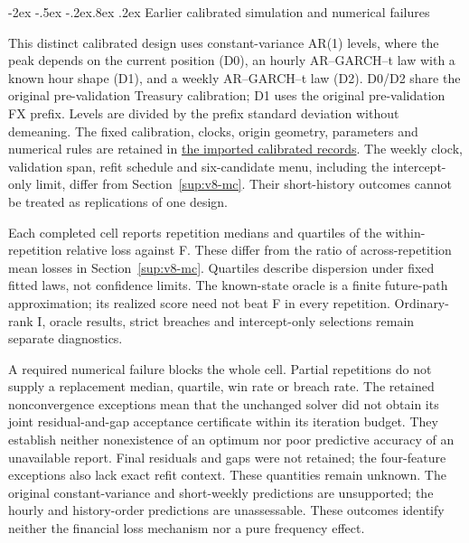 \documentclass[10pt,a4paper]{article}
\makeatletter
\renewcommand\section{\@startsection{section}{1}{\z@}%
  {-2ex \@plus -.5ex \@minus -.2ex}{.8ex \@plus .2ex}%
  {\normalfont\large\bfseries}}
\makeatother
\begin{document}
\section{Earlier calibrated simulation and numerical failures}\label{sup:v9-legacy-mc}

This distinct calibrated design uses constant-variance AR(1) levels, where the
peak depends on the current position (D0), an hourly AR--GARCH--t law with a
known hour shape (D1), and a weekly AR--GARCH--t law (D2).
D0/D2 share the original pre-validation Treasury calibration; D1 uses the
original pre-validation FX prefix. Levels are divided by the prefix standard
deviation without demeaning. The fixed calibration, clocks, origin geometry,
parameters and numerical rules are retained in
\href{https://github.com/ByronLi0207/financial-mathematics-paper-20261020/tree/revision-v10/results/v9/legacy-calibrated}{the imported calibrated records}.
The weekly clock, validation span, refit schedule and six-candidate menu,
including the intercept-only limit, differ from Section~\ref{sup:v8-mc}.
Their short-history outcomes cannot be treated as replications of one design.

Each completed cell reports repetition medians and quartiles of the
within-repetition relative loss against F. These differ from the ratio of
across-repetition mean losses in Section~\ref{sup:v8-mc}.
Quartiles describe dispersion under fixed fitted laws, not confidence limits.
The known-state oracle is a finite future-path approximation; its realized
score need not beat F in every repetition. Ordinary-rank I, oracle results,
strict breaches and intercept-only selections remain separate diagnostics.



A required numerical failure blocks the whole cell. Partial repetitions do
not supply a replacement median, quartile, win rate or breach rate.
The retained nonconvergence exceptions mean that the unchanged solver did not
obtain its joint residual-and-gap acceptance certificate within its iteration
budget. They establish neither nonexistence of an optimum nor poor predictive
accuracy of an unavailable report. Final residuals and gaps were not retained;
the four-feature exceptions also lack exact refit context. These quantities
remain unknown. The original constant-variance and short-weekly predictions
are unsupported; the hourly and history-order predictions are unassessable.
These outcomes identify neither the financial loss mechanism nor a pure
frequency effect.
\end{document}
